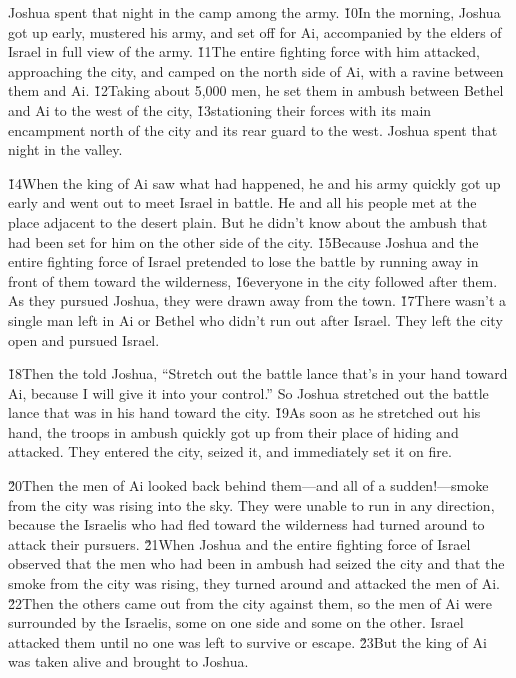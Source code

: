 Joshua spent that night in the camp among the army. \v{10}In the morning, Joshua got up early, mustered his army, and set off for Ai, accompanied by the elders of Israel in full view of the army. \v{11}The entire fighting force with him attacked, approaching the city, and camped on the north side of Ai, with a ravine between them and Ai. \v{12}Taking about 5,000 men, he set them in ambush between Bethel and Ai to the west of the city, \v{13}stationing their forces with its main encampment north of the city and its rear guard to the west. Joshua spent that night in the valley.

\v{14}When the king of Ai saw what had happened, he and his army quickly got up early and went out to meet Israel in battle. He and all his people met at the place adjacent to the desert plain. But he didn't know about the ambush that had been set for him on the other side of the city. \v{15}Because Joshua and the entire fighting force of Israel pretended to lose the battle by running away in front of them toward the wilderness, \v{16}everyone in the city followed after them. As they pursued Joshua, they were drawn away from the town. \v{17}There wasn't a single man left in Ai or Bethel who didn't run out after Israel. They left the city open and pursued Israel.

\v{18}Then the  told Joshua, ``Stretch out the battle lance that's in your hand toward Ai, because I will give it into your control.'' So Joshua stretched out the battle lance that was in his hand toward the city. \v{19}As soon as he stretched out his hand, the troops in ambush quickly got up from their place of hiding and attacked. They entered the city, seized it, and immediately set it on fire.

\v{20}Then the men of Ai looked back behind them---and all of a sudden!---smoke from the city was rising into the sky. They were unable to run in any direction, because the Israelis who had fled toward the wilderness had turned around to attack their pursuers. \v{21}When Joshua and the entire fighting force of Israel observed that the men who had been in ambush had seized the city and that the smoke from the city was rising, they turned around and attacked the men of Ai. \v{22}Then the others came out from the city against them, so the men of Ai were surrounded by the Israelis, some on one side and some on the other. Israel attacked them until no one was left to survive or escape. \v{23}But the king of Ai was taken alive and brought to Joshua.

